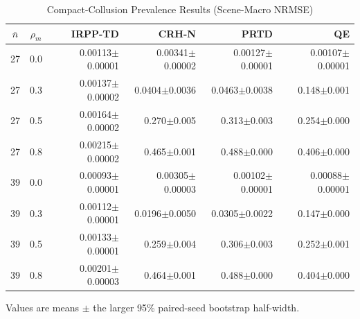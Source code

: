 \begin{table}[!t]
\centering
\caption{Compact-Collusion Prevalence Results (Scene-Macro NRMSE)}
\label{tab:rq3-prevalence-full}
\scriptsize
\setlength{\tabcolsep}{3.1pt}
\renewcommand{\arraystretch}{1.08}
\begin{tabular}{ccrrrr}
\toprule
$\bar n$ & $\rho_m$ & IRPP-TD & CRH-N & PRTD & QE \\
\midrule
27 & 0.0 & 0.00113$\pm$0.00001 & 0.00341$\pm$0.00002 & 0.00127$\pm$0.00001 & 0.00107$\pm$0.00001 \\
27 & 0.3 & 0.00137$\pm$0.00002 & 0.0404$\pm$0.0036 & 0.0463$\pm$0.0038 & 0.148$\pm$0.001 \\
27 & 0.5 & 0.00164$\pm$0.00002 & 0.270$\pm$0.005 & 0.313$\pm$0.003 & 0.254$\pm$0.000 \\
27 & 0.8 & 0.00215$\pm$0.00002 & 0.465$\pm$0.001 & 0.488$\pm$0.000 & 0.406$\pm$0.000 \\
\midrule
39 & 0.0 & 0.00093$\pm$0.00001 & 0.00305$\pm$0.00003 & 0.00102$\pm$0.00001 & 0.00088$\pm$0.00001 \\
39 & 0.3 & 0.00112$\pm$0.00001 & 0.0196$\pm$0.0050 & 0.0305$\pm$0.0022 & 0.147$\pm$0.000 \\
39 & 0.5 & 0.00133$\pm$0.00001 & 0.259$\pm$0.004 & 0.306$\pm$0.003 & 0.252$\pm$0.001 \\
39 & 0.8 & 0.00201$\pm$0.00003 & 0.464$\pm$0.001 & 0.488$\pm$0.000 & 0.404$\pm$0.000 \\
\bottomrule
\end{tabular}
\vspace{0.25ex}
\parbox{0.98\textwidth}{\scriptsize Values are means $\pm$ the larger 95\% paired-seed bootstrap half-width.}
\end{table}
